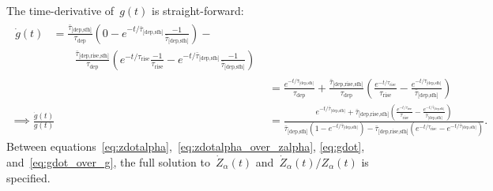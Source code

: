 \documentclass[12pt]{article}
\newcommand{\ddfrac}[2]{\frac{\displaystyle{#1}}{\displaystyle{#2}}}
\newcommand{\timescale}[1]{\ensuremath{\tau_\text{#1}}}
\newcommand{\harmonic}[2]{\ensuremath{\bar{\tau}_\text{[#1,#2]}}}
\newcommand{\hharmonic}[3]{\ensuremath{\bar{\tau}_\text{[#1,#2,#3]}}}
\begin{document}
The time-derivative of~$g(t)$ is straight-forward:
\begin{subequations}\begin{align}
\begin{split}
\dot{g}(t) &= \frac{\harmonic{dep}{sfh}}{\timescale{dep}}
\left(0 - e^{-t / \harmonic{dep}{sfh}} \frac{-1}{\harmonic{dep}{sfh}}\right) -
\\
&\qquad \frac{\hharmonic{dep}{rise}{sfh}}{\timescale{dep}}
\left(e^{-t / \timescale{rise}}\frac{-1}{\timescale{rise}} -
e^{-t / \harmonic{dep}{sfh}} \frac{-1}{\harmonic{dep}{sfh}}\right)
\end{split}
\\
&= \frac{e^{-t / \harmonic{dep}{sfh}}}{\timescale{dep}} +
\frac{\hharmonic{dep}{rise}{sfh}}{\timescale{dep}}
\left(\frac{e^{-t / \timescale{rise}}}{\timescale{rise}} -
\frac{e^{-t / \harmonic{dep}{sfh}}}{\harmonic{dep}{sfh}}\right)
\label{eq:gdot}
\\
\implies \frac{\dot{g}(t)}{g(t)} &= \ddfrac{
	e^{-t / \harmonic{dep}{sfh}} + \hharmonic{dep}{rise}{sfh}
	\left(\frac{e^{-t / \timescale{rise}}}{\timescale{rise}} -
	\frac{e^{-t / \harmonic{dep}{sfh}}}{\harmonic{dep}{sfh}}\right)
}{
	\harmonic{dep}{sfh}\left(1 - e^{-t / \harmonic{dep}{sfh}}\right) -
	\hharmonic{dep}{rise}{sfh}\left(e^{-t / \timescale{rise}} -
	e^{-t / \harmonic{dep}{sfh}}\right)
}.
\label{eq:gdot_over_g}
\end{align}\end{subequations}
Between equations~\ref{eq:zdotalpha},~\ref{eq:zdotalpha_over_zalpha},
\ref{eq:gdot}, and~\ref{eq:gdot_over_g}, the full solution
to~$\dot{Z}_\alpha(t)$ and~$\dot{Z}_\alpha(t) / Z_\alpha(t)$ is specified.
\end{document}
